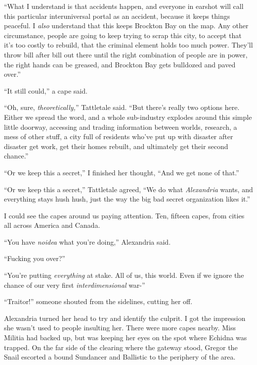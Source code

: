 ``What I understand is that accidents happen, and everyone in earshot will call this particular interuniversal portal as an accident, because it keeps things peaceful.  I \emph{also} understand that this keeps Brockton Bay on the map.  Any other circumstance, people are going to keep trying to scrap this city, to accept that it's too costly to rebuild, that the criminal element holds too much power.  They'll throw bill after bill out there until the right combination of people are in power, the right hands can be greased, and Brockton Bay gets bulldozed and paved over.''



``It still could,'' a cape said.



``Oh, sure, \emph{theoretically,}'' Tattletale said.  ``But there's really two options here.  Either we spread the word, and a whole sub-industry explodes around this simple little doorway, accessing and trading information between worlds, research, a mess of other stuff, a city full of residents who've put up with disaster after disaster get work, get their homes rebuilt, and ultimately get their second chance.''



``Or we keep this a secret,'' I finished her thought, ``And we get none of that.''



``Or we keep this a secret,'' Tattletale agreed, ``We do what \emph{Alexandria} wants, and everything stays hush hush, just the way the big bad secret organization likes it.''



I could see the capes around us paying attention.  Ten, fifteen capes, from cities all across America and Canada.



``You have \emph{no}\emph{idea} what you're doing,'' Alexandria said.



``Fucking you over?''



``You're putting \emph{everything} at stake.  All of us, this world.  Even if we ignore the chance of our very first \emph{interdimensional} war-''



``Traitor!'' someone shouted from the sidelines, cutting her off.



Alexandria turned her head to try and identify the culprit.  I got the impression she wasn't used to people insulting her.  There were more capes nearby.  Miss Militia had backed up, but was keeping her eyes on the spot where Echidna was trapped.  On the far side of the clearing where the gateway stood, Gregor the Snail escorted a bound Sundancer and Ballistic to the periphery of the area.



